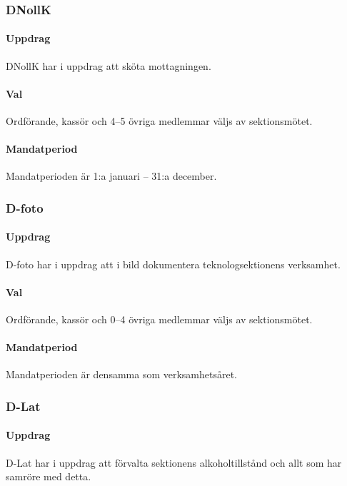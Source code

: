 \subsubsection{DNollK}

\paragraph{Uppdrag}
DNollK har i uppdrag att sköta mottagningen. 

\paragraph{Val}
Ordförande, kassör och 4--5 övriga medlemmar väljs av sektionsmötet. 

\paragraph{Mandatperiod}
Mandatperioden är 1:a januari – 31:a december.

\subsubsection{D-foto}

\paragraph{Uppdrag}
D-foto har i uppdrag att i bild dokumentera teknologsektionens verksamhet.

\paragraph{Val}
Ordförande, kassör och 0--4 övriga medlemmar väljs av sektionsmötet.

\paragraph{Mandatperiod}
Mandatperioden är densamma som verksamhetsåret.

\subsubsection{D-Lat}

\paragraph{Uppdrag} 
D-Lat har i uppdrag att förvalta sektionens alkoholtillstånd och allt som har samröre med detta.

